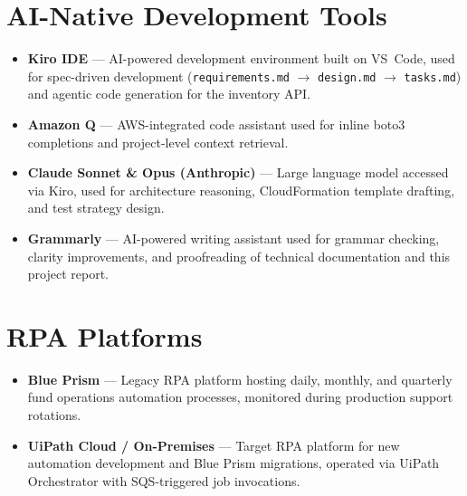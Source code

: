 \FloatBarrier

\section{AI-Native Development Tools}
\label{sec:tools_ai}


\begin{itemize}

    \item \textbf{Kiro IDE} --- AI-powered development environment
          built on VS~Code, used for spec-driven development
          (\texttt{requirements.md} $\to$ \texttt{design.md} $\to$
          \texttt{tasks.md}) and agentic code generation for the
          inventory API.

    \item \textbf{Amazon Q} --- AWS-integrated code assistant used
          for inline boto3 completions and project-level
          context retrieval.

    \item \textbf{Claude Sonnet \& Opus (Anthropic)} --- Large language model
          accessed via Kiro, used for architecture reasoning,
          CloudFormation template drafting, and test strategy design.

    \item \textbf{Grammarly} --- AI-powered writing assistant
          used for grammar checking, clarity improvements, and proofreading
          of technical documentation and this project report.

\end{itemize}

\nocite{kiro,anthropic:claude,grammarly}

\FloatBarrier

\section{RPA Platforms}
\label{sec:tools_rpa}


\begin{itemize}

    \item \textbf{Blue Prism} --- Legacy RPA platform hosting
          daily, monthly, and quarterly fund operations automation
          processes, monitored during production support rotations.

    \item \textbf{UiPath Cloud / On-Premises} --- Target RPA platform
          for new automation development and Blue Prism migrations,
          operated via UiPath Orchestrator with SQS-triggered job
          invocations.

\end{itemize}


